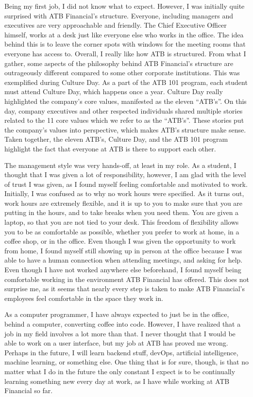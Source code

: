 \documentclass[letterpaper,12pt]{article}
\begin{document}
Being my first job, I did not know what to expect.
However, I was initially quite surprised with ATB Financial's structure. Everyone, including managers
and executives are very approachable and friendly. The Chief Executive Officer himself, works at
a desk just like everyone else who works in the office. The idea behind this is to leave the
corner spots with windows for the meeting rooms that everyone has access to.
Overall, I really like how ATB is structured. From what I gather, some aspects of the philosophy
behind ATB Financial's structure are outrageously different compared to some other corporate institutions.
This was exemplified during Culture Day.
As a part of the ATB 101 program, each student
must attend Culture Day, which happens once a year. Culture Day really highlighted the company's
core values, manifested as the eleven ``ATB's''\cite{11atb}. On this day, company executives and
other respected individuals shared multiple stories related to the 11 core values which we refer to
as the ``ATB's''. These stories put the company's values into perspective, which makes ATB's structure
make sense. Taken together, the eleven ATB's, Culture Day, and the ATB 101 program
highlight the fact that everyone at ATB is there to support each other.


The management style was very hands-off, at least in my role. As a student,
I thought that I was given a lot of responsibility, however, I am glad
with the level of trust I was given, as I found myself feeling
comfortable and motivated to work.
Initially, I was confused as to why no work hours were specified. As it turns out,
work hours are extremely flexible, and it is up to you to make sure that you are
putting in the hours, and to take breaks when you need them. You are given a laptop, so
that you are not tied to your desk. This freedom of flexibility allows you to be
as comfortable as possible, whether you prefer to work at home, in a coffee shop,
or in the office. Even though I was given the opportunity to work from home,
I found myself still showing up in person at the office
because I was able to have a human connection when attending meetings,
and asking for help. Even though I have not worked
anywhere else beforehand, I found myself being comfortable working in the
environment ATB Financial has offered. This does not surprise me, as it seems
that nearly every step is taken to make ATB Financial's employees feel
comfortable in the space they work in.


As a computer programmer, I have always expected to just be in the office, behind a computer,
converting coffee into code. However, I have realized that a job in my field
involves a lot more than that. I never thought that I would be able to work
on a user interface, but my job at ATB has proved me wrong.
Perhaps in the future, I will learn backend stuff, devOps, artificial intelligence,
machine learning, or something else. One thing that is for sure, though, is that
no matter what I do in the future the only constant I expect is to be
continually learning something new every day at work, as I have while working
at ATB Financial so far.
\end{document}
